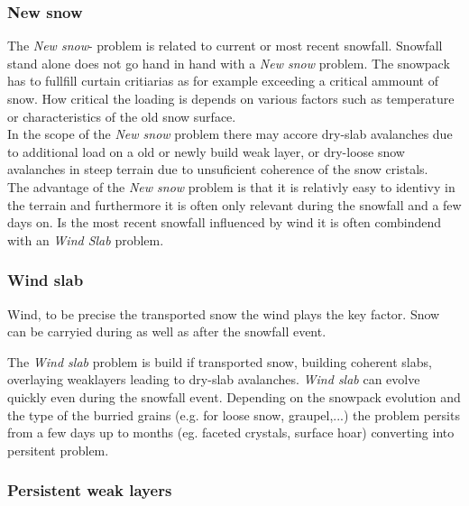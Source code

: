 \subsubsection{New snow}

The \textit{New snow}- problem is related to current or most recent snowfall.
Snowfall stand alone does not go hand in hand with a \textit{New snow} problem.
The snowpack has to fullfill curtain critiarias as for example exceeding a critical ammount of snow. 
How critical the loading is depends on various factors such as temperature or characteristics of the old snow surface. 
\cite{mittererAusbildungshandbuchTirolerLawinenkommissionen2022} \\

\noindent In the scope of the \textit{New snow} problem there may accore dry-slab avalanches due to additional load on a old or newly 
build weak layer, or dry-loose snow avalanches in steep terrain due to unsuficient coherence of the snow cristals. 
\\
\noindent The advantage of the \textit{New snow} problem is that it is relativly easy to identivy in the terrain and 
furthermore it is often only relevant during the snowfall and a few days on. Is the most recent snowfall influenced 
by wind it is often combindend with an \textit{Wind Slab}  problem.\cite{mittererAusbildungshandbuchTirolerLawinenkommissionen2022}


\subsubsection{Wind slab}

Wind, to be precise the transported snow the wind plays the key factor. Snow can be carryied during as well as after the snowfall event. 

\noindent The \textit{Wind slab} problem is build if transported snow, building coherent slabs, overlaying weaklayers leading to dry-slab 
avalanches. \textit{Wind slab} can evolve quickly even during the snowfall event. 
Depending on the snowpack evolution and the type of the burried grains (e.g. for loose snow, graupel,...) 
the problem persits from a few days up to months (eg. faceted crystals, surface hoar) converting into persitent problem.

\subsubsection{Persistent weak layers}

